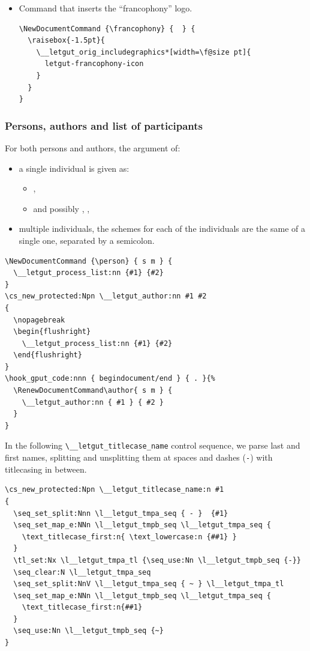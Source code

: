 \documentclass{letgut}
\begin{document}
\begin{itemize}
\item Command that inserts the \enquote{francophony} logo.
\begin{lstlisting}
\NewDocumentCommand {\francophony} {  } {
  \raisebox{-1.5pt}{
    \__letgut_orig_includegraphics*[width=\f@size pt]{
      letgut-francophony-icon
    }
  }
}
\end{lstlisting}
\end{itemize}
\subsubsection{Persons, authors and list of participants}
\label{ImplementationDocumentcommandsPersonsandauthors-h5sg55h0jlj0}
For both persons and authors, the argument of:
\begin{itemize}
\item a single individual is given as:
\begin{itemize}
\item {}, 
\item and possibly , , 
\end{itemize}
\item multiple individuals, the schemes for each of the individuals are the same of
a single one, separated by a semicolon.
\end{itemize}

\begin{lstlisting}
\NewDocumentCommand {\person} { s m } {
  \__letgut_process_list:nn {#1} {#2}
}
\cs_new_protected:Npn \__letgut_author:nn #1 #2
{
  \nopagebreak
  \begin{flushright}
    \__letgut_process_list:nn {#1} {#2}
  \end{flushright}
}
\hook_gput_code:nnn { begindocument/end } { . }{%
  \RenewDocumentCommand\author{ s m } {
    \__letgut_author:nn { #1 } { #2 }
  }
}
\end{lstlisting}

In the following \lstinline+\__letgut_titlecase_name+ control sequence, we parse last and
first names, splitting and unsplitting them at spaces and dashes (\lstinline+-+) with
titlecasing in between.

\begin{lstlisting}
\cs_new_protected:Npn \__letgut_titlecase_name:n #1
{
  \seq_set_split:Nnn \l__letgut_tmpa_seq { - }  {#1}
  \seq_set_map_e:NNn \l__letgut_tmpb_seq \l__letgut_tmpa_seq {
    \text_titlecase_first:n{ \text_lowercase:n {##1} }
  }
  \tl_set:Nx \l__letgut_tmpa_tl {\seq_use:Nn \l__letgut_tmpb_seq {-}}
  \seq_clear:N \l__letgut_tmpa_seq
  \seq_set_split:NnV \l__letgut_tmpa_seq { ~ } \l__letgut_tmpa_tl
  \seq_set_map_e:NNn \l__letgut_tmpb_seq \l__letgut_tmpa_seq {
    \text_titlecase_first:n{##1}
  }
  \seq_use:Nn \l__letgut_tmpb_seq {~}
}
\end{lstlisting}
\end{document}
